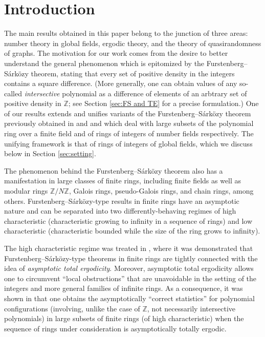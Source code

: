 \documentclass{amsart}
\theoremstyle{definition}
\numberwithin{equation}{section}
\newcommand{\Z}{\mathbb{Z}}
\begin{document}

\section{Introduction}

The main results obtained in this paper belong to the junction of three areas: number theory in global fields, ergodic theory, and the theory of quasirandomness of graphs.
The motivation for our work comes from the desire to better understand the general phenomenon which is epitomized by the Furstenberg--S\'{a}rk\"{o}zy theorem, stating that every set of positive density in the integers contains a square difference.
(More generally, one can obtain values of any so-called \emph{intersective} polynomial as a difference of elements of an arbtrary set of positive density in $\Z$; see Section \ref{sec:FS and TE} for a precise formulation.)
One of our results extends and unifies variants of the Furstenberg--S\'{a}rk\"{o}zy theorem previously obtained in \cite{bl} and \cite{br} and which deal with large subsets of the polynomial ring over a finite field and of rings of integers of number fields respectively.
The unifying framework is that of rings of integers of global fields, which we discuss below in Section \ref{sec:setting}.

The phenomenon behind the Furstenberg--S\'{a}rk\"{o}zy theorem also has a manifestation in large classes of finite rings, including finite fields as well as modular rings $\Z/N\Z$, Galois rings, pseudo-Galois rings, and chain rings, among others.
Furstenberg--S\'{a}rk\"{o}zy-type results in finite rings have an asymptotic nature and can be separated into two differently-behaving regimes of high characteristic (characteristic growing to infinity in a sequence of rings) and low characteristic (characteristic bounded while the size of the ring grows to infinity).

The high characteristic regime was treated in \cite{bb1,bb2}, where it was demonstrated that Furstenberg--S\'{a}rk\"{o}zy-type theorems in finite rings are tightly connected with the idea of \emph{asymptotic total ergodicity}.
Moreover, asymptotic total ergodicity allows one to circumvent ``local obstructions'' that are unavoidable in the setting of the integers and more general families of infinite rings.
As a consequence, it was shown in \cite{bb1,bb2} that one obtains the asymptotically ``correct statistics'' for polynomial configurations (involving, unlike the case of $\Z$, not necessarily intersective polynomials) in large subsets of finite rings (of high characteristic) when the sequence of rings under consideration is asymptotically totally ergodic.
\end{document}
